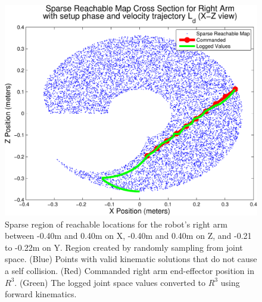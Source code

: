 \begin{figure}[thpb]
  \centering
\includegraphics[width=1.0\columnwidth]{./MATLAB/throwTrajAct.pdf}
  \caption{Sparse region of reachable locations for the robot's right arm between -0.40m and 0.40m on X, -0.40m and 0.40m on Z, and -0.21 to -0.22m on Y.  Region created by randomly sampling from joint space.  (Blue) Points with valid kinematic solutions that do not cause a self collision.  (Red) Commanded right arm end-effector position in $R^3$.  (Green) The logged joint space values converted to $R^3$ using forward kinematics.}
  \label{fig:sparseRegion}
\end{figure}

